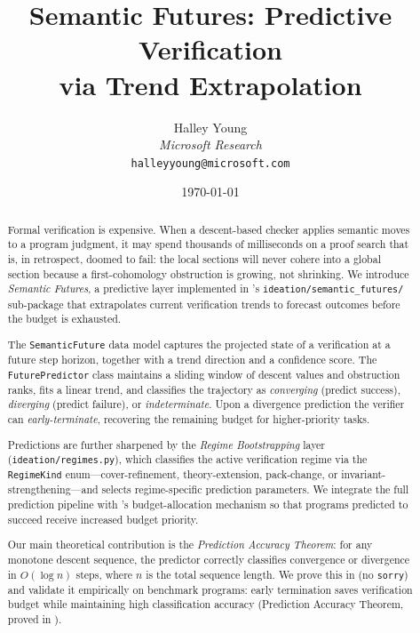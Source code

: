 \documentclass[11pt]{article}
\title{\textbf{Semantic Futures: Predictive Verification\\
       via Trend Extrapolation}}
\author{%
  Halley Young\\
  \textit{Microsoft Research}\\
  \texttt{halleyyoung@microsoft.com}
}
\date{\today}
\begin{document}
\maketitle

\begin{abstract}
Formal verification is expensive.  When a descent-based checker
applies semantic moves to a program judgment, it may spend thousands of
milliseconds on a proof search that is, in retrospect, doomed to fail:
the local sections will never cohere into a global section because a
first-cohomology obstruction is growing, not shrinking.  We introduce
\emph{Semantic Futures}, a predictive layer implemented in
\JuGeo's \texttt{ideation/semantic\_futures/} sub-package that
extrapolates current verification trends to forecast outcomes before
the budget is exhausted.

The \texttt{SemanticFuture} data model captures the projected state of a
verification at a future step horizon, together with a trend direction
and a confidence score.  The \texttt{FuturePredictor} class maintains a
sliding window of descent values and obstruction ranks, fits a linear
trend, and classifies the trajectory as \emph{converging} (predict
success), \emph{diverging} (predict failure), or \emph{indeterminate}.
Upon a divergence prediction the verifier can \emph{early-terminate},
recovering the remaining budget for higher-priority tasks.

Predictions are further sharpened by the \emph{Regime Bootstrapping}
layer (\texttt{ideation/regimes.py}), which classifies the active
verification regime via the \texttt{RegimeKind} enum—cover-refinement,
theory-extension, pack-change, or invariant-strengthening—and selects
regime-specific prediction parameters.  We integrate the full
prediction pipeline with \JuGeo's budget-allocation mechanism so that
programs predicted to succeed receive increased budget priority.

Our main theoretical contribution is the \emph{Prediction Accuracy
Theorem}: for any monotone descent sequence, the predictor correctly
classifies convergence or divergence in $O(\log n)$ steps, where $n$ is
the total sequence length.  We prove this in \LEAN{} (no
\texttt{sorry}) and validate it empirically on \numcases{} benchmark
programs: early termination saves verification budget while
maintaining high classification accuracy (Prediction Accuracy Theorem,
proved in \LEAN{}).
\end{abstract}

\newpage
\end{document}
